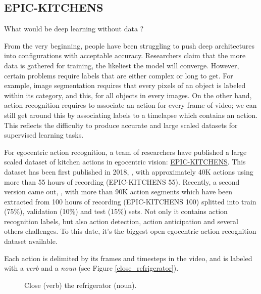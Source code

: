 \documentclass[12pt, a4paper]{report}
\begin{document}
			\subsection{EPIC-KITCHENS}
				What would be deep learning without data ?
				\par
				From the very beginning, people have been struggling to push deep architectures into configurations with acceptable accuracy.
				Researchers claim that the more data is gathered for training, the likeliest the model will converge.
				However, certain problems require labels that are either complex or long to get.
				For example, image segmentation requires that every pixels of an object is labeled within its category, and this, for all objects in every images.
				On the other hand, action recognition requires to associate an action for every frame of video; we can still get around this by associating labels to a timelapse which contains an action.
				This reflects the difficulty to produce accurate and large scaled datasets for supervised learning tasks.
				\par
				For egocentric action recognition, a team of researchers have published a large scaled dataset of kitchen actions in egocentric vision: \href{https://epic-kitchens.github.io/2021}{EPIC-KITCHENS}.
				This dataset has been first published in 2018, \cite{damen2018scaling}, with approximately 40K actions using more than 55 hours of recording (EPIC-KITCHENS 55).
				Recently, a second version came out, \cite{damen2020rescaling}, with more than 90K action segments which have been extracted from 100 hours of recording (EPIC-KITCHENS 100) splitted into train (75\%), validation (10\%) and test (15\%) sets.
				Not only it contains action recognition labels, but also action detection, action anticipation and several others challenges.
				To this date, it's the biggest open egocentric action recognition dataset available.
				\par
				Each action is delimited by its frames and timesteps in the video, and is labeled with a {\itshape verb} and a {\itshape noun} (see Figure \ref{close_refrigerator}).
				\begin{figure}[h!]
					\centering
					\caption{Close ({\small verb}) the refrigerator ({\small noun}).}
				\end{figure}
\end{document}
